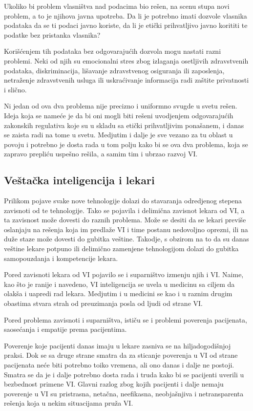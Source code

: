 \documentclass[a4paper]{article}
\begin{document}
Ukoliko bi problem vlasništva nad podacima bio rešen, na scenu stupa novi problem, a to je njihova javna upotreba. Da li je potrebno imati dozvole vlasnika podataka da se ti podaci javno koriste, da li je etički prihvatljivo javno korititi te podatke bez pristanka vlasnika?

Korišćenjem tih podataka bez odgovarajućih dozvola mogu nastati razni problemi. Neki od njih su emocionalni stres zbog izlaganja osetljivih zdravstvenih podataka, diskriminacija, lišavanje zdravstvenog osiguranja ili zaposlenja, netraženje zdravstvenih usluga ili uskraćivanje informacija radi zaštite privatnosti i slično.

Ni jedan od ova dva problema nije precizno i uniformno svugde u svetu rešen. Ideja koja se nameće je da bi oni mogli biti rešeni uvodjenjem odgovarajućih zakonskih regulativa koje su u skladu sa etički prihvatljivim ponašanem, i danas se zaista radi na tome u svetu. Medjutim i dalje je sve vezano za tu oblast u povoju i potrebno je dosta rada u tom polju kako bi se ova dva problema, koja se zapravo prepliću uspešno rešila, a samim tim i ubrzao razvoj VI.

\subsection{Veštačka inteligencija i lekari}
\label{subsec:veštačka_inteligencija_i_lekari}

Prilikom pojave svake nove tehnologije dolazi do stavaranja odredjenog stepena zavisnoti od te tehnologije. Tako se pojavila i delimična zavisnot lekara od VI, a ta zavisnost može dovesti do raznih problema. Može se desiti da se lekari previše oslanjaju na rešenja koja im predlaže VI i time postanu nedovoljno oprezni, ili na duže staze može dovesti do gubitka veštine. Takodje, s obzirom na to da su danas veštine lekare potpuno ili delimično zamenjene tehnologijom dolazi do gubitka samopouzdanja i kompetencije lekara.

Pored zavisnoti lekara od VI pojavilo se i suparništvo izmenju njih i VI. Naime, kao što je ranije i navedeno, VI inteligencija se uvela u medicinu sa ciljem da olakša i uapredi rad lekara. Medjutim i u medicini se kao i u raznim drugim obastima stvara strah od preuzimanja posla od ljudi od strane VI.

Pored problema zavisnoti i suparništva, ističu se i problemi poverenja pacijenata, saosećanja i empatije prema pacijentima.

Poverenje koje pacijenti danas imaju u lekare zasniva se na hiljadogodišnjoj praksi. Dok se sa druge strane smatra da za sticanje poverenja u VI od strane pacijenata neće biti potrebno toiko vremena, ali ono danas i dalje ne postoji. Smatra se da je i dalje potrebno dosta rada i truda kako bi se pacijenti uverili u bezbednost primene VI. Glavni razlog zbog kojih pacijenti i dalje nemaju poverenje u VI su pristrasna, netačna, neefikasna, neobjašnjiva i netransparenta rešenja koja u nekim situacijama pruža VI.
\end{document}
